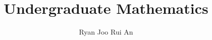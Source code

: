 \begin{titlepage}
\title{\sffamily\bfseries Undergraduate Mathematics}
\author{Ryan Joo Rui An}
\date{}

\end{titlepage}

\maketitle